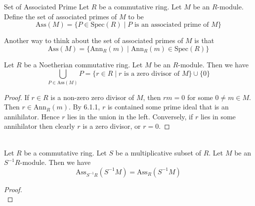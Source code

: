 \documentclass[a4paper]{article}
\begin{document}
\begin{defn}{Set of Associated Prime}{} Let $R$ be a commutative ring. Let $M$ be an $R$-module. Define the set of associated primes of $M$ to be $$\text{Ass}(M)=\{P\in\text{Spec}(R)\;|\;P\text{ is an associated prime of }M\}$$
\end{defn}

Another way to think about the set of associated primes of $M$ is that $$\text{Ass}(M)=\{\text{Ann}_R(m)\;|\;\text{Ann}_R(m)\in\text{Spec}(R)\}$$

\begin{lmm}{}{} Let $R$ be a Noetherian commutative ring. Let $M$ be an $R$-module. Then we have $$\bigcup_{P\in\text{Ass}(M)}P=\{r\in R\;|\;r\text{ is a zero divisor of }M\}\cup\{0\}$$ 
\begin{proof}
If $r\in R$ is a non-zero zero divisor of $M$, then $rm=0$ for some $0\neq m\in M$. Then $r\in\text{Ann}_R(m)$. By 6.1.1, $r$ is contained some prime ideal that is an annihilator. Hence $r$ lies in the union in the left. Conversely, if $r$ lies in some annihilator then clearly $r$ is a zero divisor, or $r=0$. 
\end{proof}
\end{lmm}

\begin{prp}{}{}\\
Let $R$ be a commutative ring. Let $S$ be a multiplicative subset of $R$. Let $M$ be an $S^{-1}R$-module. Then we have $$\text{Ass}_{S^{-1}R}(S^{-1}M)=\text{Ass}_R(S^{-1}M)$$
\begin{proof}\\

\end{proof}
\end{prp}
\end{document}
